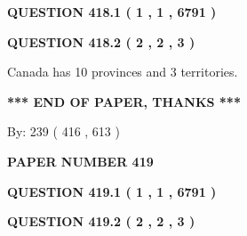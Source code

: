 \documentclass[12pt]{article}
\begin{document}
{\textbf{\Large{QUESTION
418.1 
 ( 1 , 1 , 6791 )
}}}
  
  
  
\vspace{0.2in}
  
{\textbf{\Large{QUESTION
418.2 
 ( 2 , 2 , 3 )
}}}
  
  
 
 
\noindent{}
 
 
Canada has 10  provinces and 3 territories.
 
 
 
 
   
   
 \vspace{0.2in}
 
   
   
   
   
\vspace{1.0in} 
{\textbf{\large{ *** END OF PAPER, THANKS *** }}} 
   
   
\hspace{1.0in} By: 
 239 ( 416 ,  613 )
   
   
   
   
\newpage 
\setcounter{page}{ 
   419001 } 
   
   
   
   
 {\textbf{ \Large{ PAPER NUMBER  419  }}}
   
   
\vspace{0.2in}
   
   
   
   
   
   
 \vspace{0.2in}
 
 
 
 
   
   
  
\vspace{0.2in}
  
{\textbf{\Large{QUESTION
419.1 
 ( 1 , 1 , 6791 )
}}}
  
  
  
\vspace{0.2in}
  
{\textbf{\Large{QUESTION
419.2 
 ( 2 , 2 , 3 )
}}}
  
  
 
 
\noindent{}
 
\end{document}
